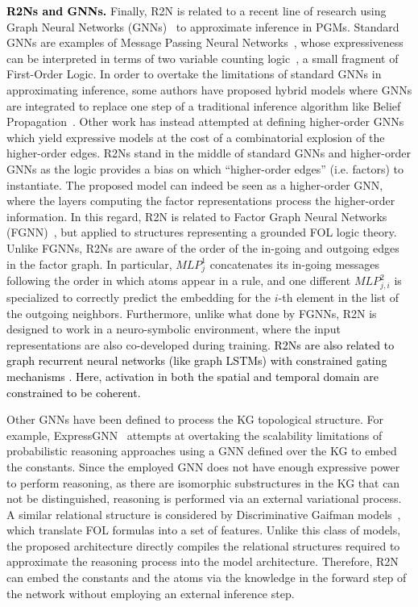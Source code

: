 \documentclass[journal]{IEEEtran}
\newcommand{\ar}[1]{\textcolor{black}{#1}}
\begin{document}
\ar{{\bf R2Ns and GNNs. }} Finally, R2N is related to a recent line of research using Graph Neural Networks (GNNs)~\cite{scarselli2009graph,wu2020comprehensive} to approximate inference in PGMs.
Standard GNNs are examples of Message Passing Neural Networks~\cite{gilmer2017neural}, whose expressiveness can be interpreted in terms of two variable counting logic~\cite{grohe2021logic}, a small fragment of First-Order Logic.
In order to overtake the limitations of standard GNNs in approximating inference, some authors have proposed hybrid models where GNNs are integrated to replace one step of a traditional inference algorithm like Belief Propagation~\cite{kuck2020belief,satorras2021neural}.
Other work has instead attempted at defining higher-order GNNs~\cite{morris2019weisfeiler} which yield expressive models at the cost of a combinatorial explosion of the higher-order edges. R2Ns stand in the middle of standard GNNs and higher-order GNNs as the logic provides a bias on which ``higher-order edges'' (i.e. factors) to instantiate.
The proposed model can indeed be seen as a higher-order GNN, where the layers computing the factor representations process the higher-order information. In this regard, R2N is related to Factor Graph Neural Networks (FGNN)~\cite{zhen2020nips}, but applied to structures representing a grounded FOL logic theory.
Unlike FGNNs, R2Ns are aware of the order of the in-going and outgoing edges in the factor graph. In particular,  $MLP^1_j$ concatenates its in-going messages following the order in which atoms appear in a rule, and one different $MLP^2_{j,i}$ is specialized to correctly predict the embedding for the $i$-th element in the list of the outgoing neighbors.
Furthermore, unlike what done by FGNNs, R2N is designed to work in a neuro-symbolic environment, where the input representations are also co-developed during training. \ar{R2Ns are also related to graph recurrent neural networks (like graph LSTMs) with constrained gating mechanisms \cite{tang2019coherence,yan2020social}. Here, activation in both the spatial and temporal domain are constrained to be coherent.}

Other GNNs have been defined to process the KG topological structure. For example, ExpressGNN~\cite{zhang2020efficient} attempts at overtaking the scalability limitations of probabilistic reasoning approaches using a GNN defined over the KG to embed the constants. Since the employed GNN does not have enough expressive power to perform reasoning, as there are isomorphic substructures in the KG that can not be distinguished, reasoning is performed via an external variational process.
A similar relational structure is considered by Discriminative Gaifman models~\cite{niepert2016discriminative}, which translate FOL formulas into a set of features.
Unlike this class of models, the proposed architecture directly compiles the relational structures required to approximate the reasoning process into the model architecture. Therefore, R2N can embed the constants and the atoms via the knowledge in the forward step of the network without employing an external inference step. 
\end{document}

